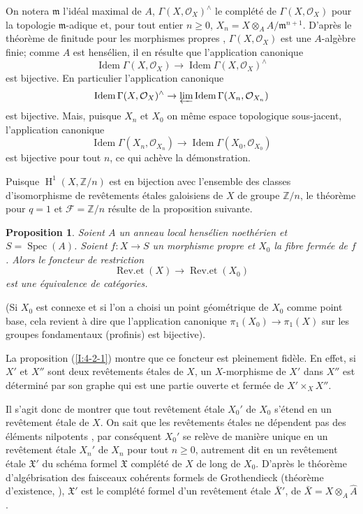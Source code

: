 \documentclass{book}
\DeclareMathOperator{\h}{H}
\DeclareMathOperator{\spec}{Spec}
\newcommand{\cF}{\mathcal{F}}
\newcommand{\cO}{\mathcal{O}}
\newcommand{\dZ}{\mathbb{Z}}
\newcommand{\fm}{\mathfrak{m}}
\newcommand{\fX}{\mathfrak{X}}
\newtheorem{proposition}[subsubsection]{Proposition}
\begin{document}
On notera $\fm$ l'idéal maximal de $A$, $\Gamma(X,\cO_X)^\wedge$ le complété 
de $\Gamma(X,\cO_X)$ pour la topologie $\fm$-adique et, pour tout entier 
$n\geqslant 0$, $X_n=X\otimes_A A/\fm^{n+1}$. D'après le théorème de finitude 
pour les morphismes propres \cite[III.3.2]{8}, $\Gamma(X,\cO_X)$ est une 
$A$-algèbre finie; comme $A$ est hensélien, il en résulte que 
l'application canonique 
\[
  \operatorname{Idem} \Gamma(X,\cO_X) \to \operatorname{Idem}\Gamma(X,\cO_X)^\wedge
\]
est bijective. En particulier l'application canonique 
\[
  \operatorname{Idem} \Gamma(X,\cO_X)^\wedge \to \varprojlim \operatorname{Idem}\Gamma(X_n,\cO_{X_n})
\]
est bijective. Mais, puisque $X_n$ et $X_0$ on même espace topologique 
sous-jacent, l'application canonique 
\[
  \operatorname{Idem}\Gamma(X_n,\cO_{X_n}) \to \operatorname{Idem} \Gamma(X_0,\cO_{X_0})
\]
est bijective pour tout $n$, ce qui achève la démonstration. 

Puisque $\h^1(X,\dZ/n)$ est en bijection avec l'ensemble des classes 
d'isomorphisme de revêtements étales galoisiens de $X$ de groupe $\dZ/n$, 
le théorème  pour $q=1$ et $\cF=\dZ/n$ résulte de la proposition suivante. 





\begin{proposition}\label{I:4-2-2}
Soient $A$ un anneau local hensélien noethérien et $S=\spec(A)$. Soient 
$f:X\to S$ un morphisme propre et $X_0$ la fibre fermée de $f$. Alors le 
foncteur de restriction 
\[
  \operatorname{Rev.et}(X) \to \operatorname{Rev.et}(X_0)
\]
est une équivalence de catégories. 
\end{proposition}

(Si $X_0$ est connexe et si l'on a choisi un point géométrique de $X_0$ 
comme point base, cela revient à dire que l'application canonique 
$\pi_1(X_0)\to \pi_1(X)$ sur les groupes fondamentaux (profinis) est 
bijective). 

La proposition (\ref{I:4-2-1}) montre que ce foncteur est pleinement fidèle. En 
effet, si $X'$ et $X''$ sont deux revêtements étales de $X$, un 
$X$-morphisme de $X'$ dans $X''$ est déterminé par son graphe qui est une 
partie ouverte et fermée de $X'\times_X X''$. 

Il s'agit donc de montrer que tout revêtement étale $X_0'$ de $X_0$ s'étend 
en un revêtement étale de $X$. On sait que les revêtements étales ne 
dépendent pas des éléments nilpotents \cite[chap. 1]{7}, par conséquent 
$X_0'$ se relève de manière unique en un revêtement étale $X_n'$ de 
$X_n$ pour tout $n\geqslant 0$, autrement dit en un revêtement étale 
$\fX'$ du schéma formel $\fX$ complété de $X$ de long de $X_0$. D'après 
le théorème d'algébrisation des faisceaux cohérents formels de 
Grothendieck (théorème d'existence, \cite[III.5]{8}), $\fX'$ est le 
complété formel d'un revêtement étale $\bar X'$, de 
$\bar X=X\otimes_A \hat A$. 
\end{document}
